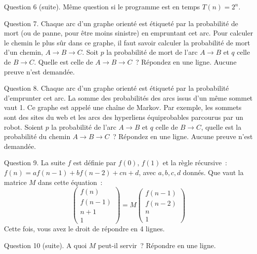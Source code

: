 \documentclass[a4paper,12pt]{article}
\begin{document}
Question 6 (suite). Même question si le programme est en temps $T(n)=2^n$.

Question 7. Chaque arc d'un graphe orienté est étiqueté par la probabilité de  mort (ou de panne, pour être moins sinistre)  en empruntant cet arc. 
Pour calculer le chemin le plus sûr dans ce graphe, il faut savoir calculer la probabilité de mort d'un chemin,  $A \rightarrow B \rightarrow C$.
Soit $p$ la probabilité de mort de l'arc  $A \rightarrow B$ et $q$ celle
de $B \rightarrow C$. Quelle est celle de  $A \rightarrow B \rightarrow C$~?
Répondez en une ligne. Aucune preuve n'est demandée.

Question 8.  Chaque arc d'un graphe orienté est étiqueté par la probabilité d'emprunter cet arc. La somme des probabilités des arcs issus d'un même sommet vaut 1. Ce graphe est appelé une chaîne de Markov. Par exemple, les sommets sont des sites du web et les arcs des hyperliens équiprobables parcourus par un robot. Soient $p$ la probabilité de l'arc  $A \rightarrow B$ et $q$ celle
de $B \rightarrow C$, quelle est la probabilité du chemin $A \rightarrow B \rightarrow C$~?
Répondez en une ligne. Aucune preuve n'est demandée.
  
Question 9. La suite $f$ est définie par $f(0)$, $f(1)$ et la règle récursive~:
$f(n)=a f(n-1) + b f(n-2) + cn + d$, avec $a, b, c, d$ donnés.
Que vaut la matrice $M$ dans cette équation~:
$$ \left(\begin{array}{l} f(n) \\
f(n-1) \\
n+1 \\
1
\end{array}\right)= M \left(\begin{array}{l} f(n-1)  \\
f(n-2) \\
n \\
1
\end{array}\right)$$ 
Cette fois, vous avez le droit de répondre en 4 lignes.

Question 10 (suite). A quoi $M$ peut-il servir~?  Répondre en une ligne.
\end{document}
